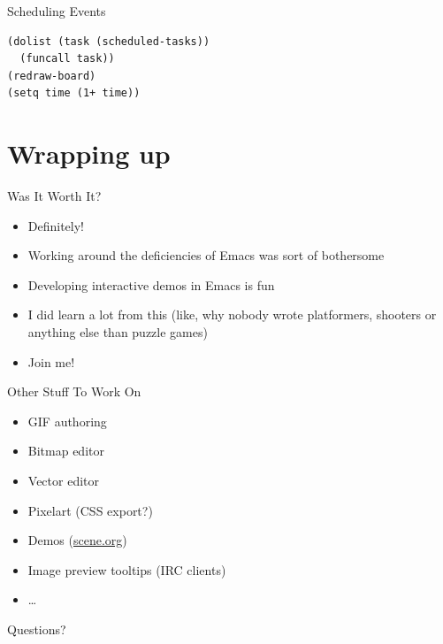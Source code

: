 \documentclass[presentation]{beamer}
\begin{document}
\begin{frame}[fragile,label=sec-4-14]{Scheduling Events}
 \begin{verbatim}
(dolist (task (scheduled-tasks))
  (funcall task))
(redraw-board)
(setq time (1+ time))
\end{verbatim}
\end{frame}

\section{Wrapping up}
\label{sec-5}

\begin{frame}[label=sec-5-1]{Was It Worth It?}
\begin{itemize}
\item Definitely!
\item Working around the deficiencies of Emacs was sort of bothersome
\item Developing interactive demos in Emacs is fun
\item I did learn a lot from this (like, why nobody wrote platformers,
shooters or anything else than puzzle games)
\item Join me!
\end{itemize}
\end{frame}

\begin{frame}[label=sec-5-2]{Other Stuff To Work On}
\begin{itemize}
\item GIF authoring
\item Bitmap editor
\item Vector editor
\item Pixelart (CSS export?)
\item Demos (\href{https://www.scene.org/}{scene.org})
\item Image preview tooltips (IRC clients)
\item \ldots{}
\end{itemize}
\end{frame}

\begin{frame}[label=sec-5-3]{Questions?}
\end{frame}
\end{document}
